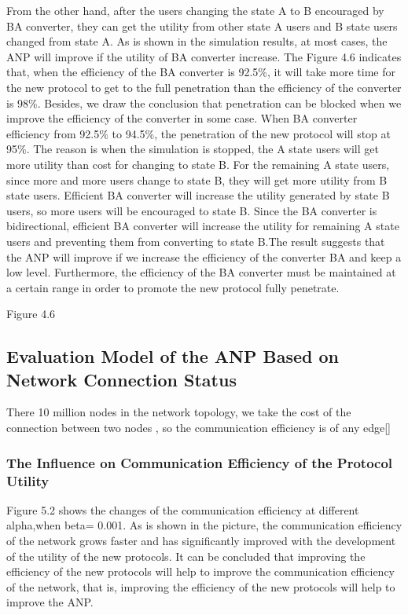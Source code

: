 \documentclass{article}
\begin{document}
From the other hand, after the users changing the state A to B encouraged by BA converter, they can get the utility from other state A users and  B state users changed from state A. As is shown in the simulation results, at most cases, the ANP will improve if the utility of BA converter increase. The Figure 4.6 indicates that, when the efficiency of the BA converter is 92.5\%, it will take more time for the new protocol to get to the full penetration than the efficiency of the converter is 98\%. Besides, we draw the conclusion that penetration can be blocked when we improve the efficiency of the converter in some case. When BA converter efficiency from 92.5\% to 94.5\%,  the penetration of the new protocol will stop at 95\%. The reason is when the simulation is stopped, the A state users will get more utility than cost for changing to state B. For the remaining A state users, since more and more users change to state B, they will get more utility from B state users.   Efficient BA converter will increase the utility generated by state B users, so more users will be encouraged to state B. Since the BA converter is bidirectional, efficient BA converter will increase the utility for remaining A state users and preventing them from converting to state B.The result suggests that the ANP will improve if we increase the efficiency of the converter BA and keep a low level. Furthermore, the efficiency of the BA converter must be maintained at a certain range in order to promote the new protocol fully penetrate. 

Figure 4.6

\subsection{Evaluation Model of the ANP Based on Network Connection Status}
There 10 million nodes in the network topology, we take the cost of the connection between two nodes , so the communication efficiency is of any edge[]
\subsubsection{The Influence on Communication Efficiency  of the Protocol Utility}
Figure 5.2 shows the changes of the communication efficiency at different alpha,when beta= 0.001. As is shown in the picture, the communication efficiency of the network grows faster and has significantly improved with the development of the utility of the new protocols. It can be concluded that improving the efficiency of the new protocols will help to improve the communication efficiency of the network, that is, improving the efficiency of the new protocols will help to improve the ANP. 
\end{document}
